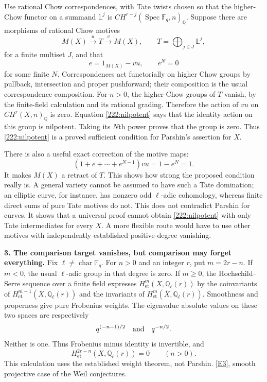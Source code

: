 \documentclass[11pt,a4paper]{article}
\newcommand{\Q}{\mathbb{Q}}
\newcommand{\F}{\mathbb{F}}
\newcommand{\eref}[2]{\hyperlink{extra:#1:#2}{[E#2]}}
\numberwithin{equation}{section}
\begin{document}
Use rational Chow correspondences, with Tate twists chosen so that the
higher-Chow functor on a summand $\mathbb L^j$ is
$CH^{r-j}(\operatorname{Spec}\F_q,n)_{\Q}$.
Suppose there are morphisms of rational Chow motives
\[
 M(X)\xrightarrow{u}T\xrightarrow{v}M(X),\qquad
 T=\bigoplus_{j\in J}\mathbb L^j,
\]
for a finite multiset $J$, and that
\begin{equation}\label{222:nilpotent}
 e=1_{M(X)}-v u,\qquad e^N=0
\end{equation}
for some finite $N$. Correspondences act functorially on higher Chow
groups by pullback, intersection and proper pushforward; their
composition is the usual correspondence composition. For $n>0$, the
higher-Chow groups of $T$ vanish, by the finite-field calculation and
its rational grading. Therefore the action of $vu$ on
$CH^r(X,n)_{\Q}$ is zero. Equation \eqref{222:nilpotent} says that the
identity action on this group is nilpotent. Taking its $N$th power
proves that the group is zero. Thus \eqref{222:nilpotent} is a proved
sufficient condition for Parshin's assertion for $X$.

There is also a useful exact correction of the motive maps:
\[
 (1+e+\cdots+e^{N-1})vu=1-e^N=1.
\]
It makes $M(X)$ a retract of $T$. This shows how strong the proposed
condition really is. A general variety cannot be assumed to have such
a Tate domination; an elliptic curve, for instance, has nonzero odd
$\ell$-adic cohomology, whereas finite direct sums of pure Tate motives
do not. This does not contradict Parshin for curves. It shows that a
universal proof cannot obtain \eqref{222:nilpotent} with only Tate
intermediates for every $X$. A more flexible route would have to use
other motives with independently established positive-degree vanishing.

\textbf{3. The comparison target vanishes, but comparison may forget everything.}
Fix $\ell\ne\operatorname{char}\F_q$. For $n>0$ and an integer $r$,
put $m=2r-n$. If $m<0$, the usual $\ell$-adic group in that degree is
zero. If $m\ge0$, the Hochschild--Serre sequence over a finite field
expresses $H^m_{\mathrm{et}}(X,\Q_\ell(r))$ by the coinvariants of
$H^{m-1}_{\mathrm{et}}(\overline X,\Q_\ell(r))$ and the invariants of
$H^m_{\mathrm{et}}(\overline X,\Q_\ell(r))$.
Smoothness and properness give pure Frobenius weights. The eigenvalue
absolute values on these two spaces are respectively
\[
 q^{(-n-1)/2}\quad\hbox{and}\quad q^{-n/2}.
\]
Neither is one. Thus Frobenius minus identity is invertible, and
\begin{equation}\label{222:etale}
 H^{2r-n}_{\mathrm{et}}(X,\Q_\ell(r))=0\qquad(n>0).
\end{equation}
This calculation uses the established weight theorem, not Parshin.
\eref{222}{3}, smooth projective case of the Weil conjectures.
\end{document}
